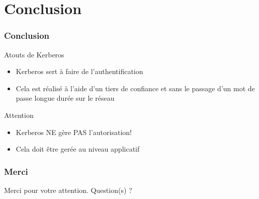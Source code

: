 \documentclass[svgnames]{beamer}
\begin{document}
\section*{Conclusion}
\begin{frame}
  \frametitle{Conclusion}
  
  \begin{exampleblock}{Atouts de Kerberos}
  \begin{itemize}
   \item Kerberos sert à faire de l'authentification
   \item Cela est réalisé à l'aide d'un tiers de confiance et sans le passage d'un mot de passe longue durée sur le réseau
     \end{itemize}
   \end{exampleblock}


  
 \begin{alertblock}{Attention}
   \begin{itemize}
    \item Kerberos NE gère PAS l'autorisation!
    \item Cela doit être gerée au niveau applicatif
   \end{itemize}
  \end{alertblock}

\end{frame}


\begin{frame}
  \frametitle{Merci}
  \begin{center}
    Merci pour votre attention. Question(s) ?
  \end{center}
\end{frame}
\end{document}
